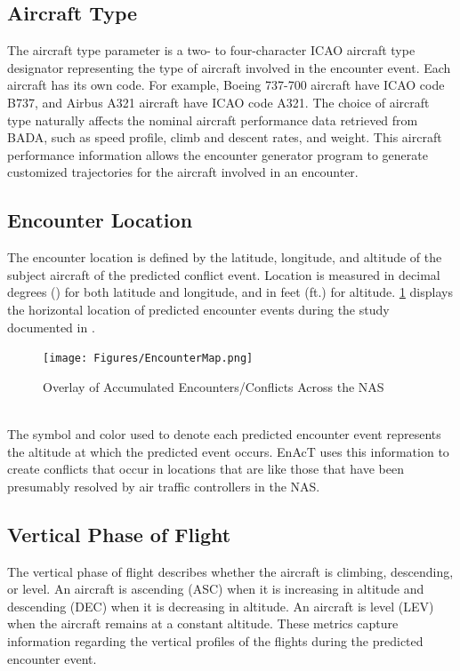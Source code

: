 \subsection{Aircraft Type}
The aircraft type parameter is a two- to four-character ICAO aircraft type designator representing the type of aircraft involved in the encounter event. Each aircraft has its own code. For example, Boeing 737-700 aircraft have ICAO code B737, and Airbus A321 aircraft have ICAO code A321. The choice of aircraft type naturally affects the nominal aircraft performance data retrieved from BADA, such as speed profile, climb and descent rates, and weight. This aircraft performance information allows the encounter generator program to generate customized trajectories for the aircraft involved in an encounter.

\subsection{Encounter Location}
The encounter location is defined by the latitude, longitude, and altitude of the subject aircraft of the predicted conflict event. Location is measured in decimal degrees (\textdegree) for both latitude and longitude, and in feet (ft.) for altitude. \ref{fig:map} displays the horizontal location of predicted encounter events during the study documented in \cite{paglione:2008}.

\begin{figure}[H]
\centering
\texttt{[image: Figures/EncounterMap.png]}
\caption{Overlay of Accumulated Encounters/Conflicts Across the NAS \cite{paglione:2008}}
\label{fig:map}
\end{figure}
~\\

The symbol and color used to denote each predicted encounter event represents the altitude at which the predicted event occurs. EnAcT uses this information to create conflicts that occur in locations that are like those that have been presumably resolved by air traffic controllers in the NAS.

\subsection{Vertical Phase of Flight}
The vertical phase of flight describes whether the aircraft is climbing, descending, or level. An aircraft is ascending (ASC) when it is increasing in altitude and descending (DEC) when it is decreasing in altitude. An aircraft is level (LEV) when the aircraft remains at a constant altitude. These metrics capture information regarding the vertical profiles of the flights during the predicted encounter event.


